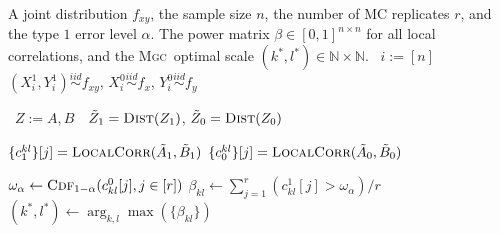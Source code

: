 \documentclass[11pt]{article}
\providecommand{\sct}[1]{{\normalfont\textsc{#1}}}
\newcommand{\G}{c}
\newcommand{\Linefor}[2]{%
    \State \algorithmicfor\ {#1}\ \algorithmicdo\ {#2} \algorithmicend\ \algorithmicfor%
}
\newcommand{\Mgc}{\sct{Mgc}}
\newcommand{\rto}{\leftarrow}
\begin{document}
\begin{algorithm}
\caption{Compute power for all local tests. This algorithm computes the  power of all local correlations. By repeatedly simulating samples by the joint distribution $f_{xy}$, sample data of size $n$ under the null and the alternative are generated for $r$ Monte-Carlo replicates. Then all local correlations under the null and the alternative hypotheses are computed by Algorithm~\ref{alg:all_scales}, followed by estimating the testing power at each local correlation. The optimal scales of Oracle \Mgc~can be found by all scales that maximizes the power. The running time is $O(rn^2 \log n)$. In the simulations we use $r=2$,$000$ MC replicates to estimate the optimal scale, and another $r=10$,$000$ MC replicates to estimate the power. This algorithm can be similarly adapted to training data, for which the alternative statistic can be computed from the training data while the null statistic can be computed by permutation. Note that power computation for sample \Mgc~or other benchmarks follows from the same algorithm, by plugging in the respective test statistic in the first loop without the optimal scale computation. }
\label{alg:power}
\begin{algorithmic}[1]
\Require A joint distribution $f_{xy}$, the sample size $n$, the number of MC replicates $r$, and the type $1$ error level $\alpha$.
\Ensure The power matrix $\beta \in [0,1]^{n \times n}$ for all local correlations, and the \Mgc~optimal scale $(k^{*},l^{*}) \in \mathbb{N} \times \mathbb{N}$.
\Linefor{$i:=[n]$}{$(X^{1}_{i},Y^{1}_{i}) \stackrel{iid}{\sim} f_{xy}$, $X^{0}_{i} \stackrel{iid}{\sim} f_{x}$, $Y^{0}_{i} \stackrel{iid}{\sim} f_{y}$} 
\Linefor{$Z:=A,B$}{$\tilde{Z}_{1}=\textsc{Dist}(Z_{1})$, $\tilde{Z}_{0}=\textsc{Dist}(Z_{0})$} 
\State $\{\G^{kl}_{1}\}[j]=\textsc{LocalCorr}(\tilde{A}_{1},\tilde{B}_{1})$ 
\State $\{\G^{kl}_{0}\}[j]=\textsc{LocalCorr}(\tilde{A}_{0},\tilde{B}_{0})$ 
\EndFor

\State $\omega_{\alpha} \rto \textsc{Cdf}_{1-\alpha}(\G^{0}_{kl}[j],j \in [r])$ 
\State $\beta_{kl} \rto \sum_{j=1}^{r}(\G^{1}_{kl}[j]>\omega_{\alpha}) / r$ 
\EndFor
\State $(k^{*},l^{*}) \rto \arg_{k,l}\max(\{\beta_{kl}\})$ 
\EndFunction
\end{algorithmic}
\end{algorithm}
\end{document}
